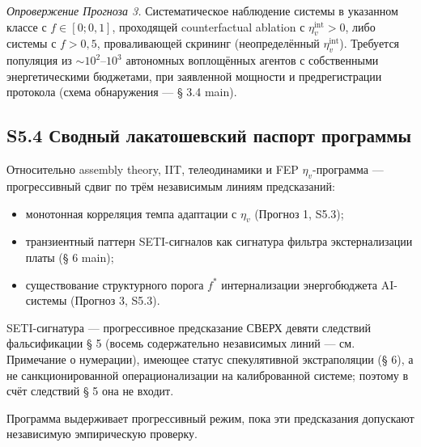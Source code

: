 \documentclass[pdflatex,sn-mathphys-ay]{sn-jnl}
\providecommand{\tightlist}{\setlength{\itemsep}{0pt}\setlength{\parskip}{0pt}}
\begin{document}
\emph{Опровержение Прогноза 3.} Систематическое наблюдение системы в указанном классе с \(f \in [0; 0{,}1]\), проходящей counterfactual ablation с \(\eta_v^{\text{int}} > 0\), либо системы с \(f > 0{,}5\), проваливающей скрининг (неопределённый \(\eta_v^{\text{int}}\)). Требуется популяция из \(\sim 10^2\)--\(10^3\) автономных воплощённых агентов с собственными энергетическими бюджетами, при заявленной мощности и предрегистрации протокола (схема обнаружения --- § 3.4 main).

\subsection*{S5.4 Сводный лакатошевский паспорт программы}\label{s5.4-ux441ux432ux43eux434ux43dux44bux439-ux43bux430ux43aux430ux442ux43eux448ux435ux432ux441ux43aux438ux439-ux43fux430ux441ux43fux43eux440ux442-ux43fux440ux43eux433ux440ux430ux43cux43cux44b}

Относительно assembly theory, IIT, телеодинамики и FEP \(\eta_v\)-программа --- прогрессивный сдвиг по трём независимым линиям предсказаний:

\begin{itemize}
\tightlist
\item
  монотонная корреляция темпа адаптации с \(\eta_v\) (Прогноз 1, S5.3);
\item
  транзиентный паттерн SETI-сигналов как сигнатура фильтра экстернализации платы (§ 6 main);
\item
  существование структурного порога \(f^*\) интернализации энергобюджета AI-системы (Прогноз 3, S5.3).
\end{itemize}

SETI-сигнатура --- прогрессивное предсказание СВЕРХ девяти следствий фальсификации § 5 (восемь содержательно независимых линий --- см. Примечание о нумерации), имеющее статус спекулятивной экстраполяции (§ 6), а не санкционированной операционализации на калиброванной системе; поэтому в счёт следствий § 5 она не входит.

Программа выдерживает прогрессивный режим, пока эти предсказания допускают независимую эмпирическую проверку.


\nocite{*}

\end{document}
